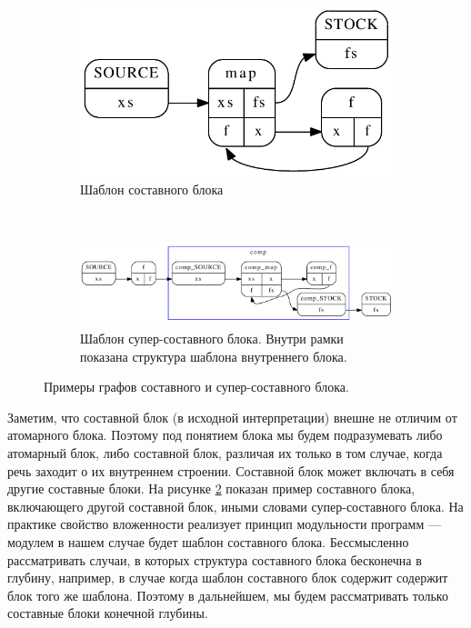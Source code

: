 \documentclass[10pt,a4paper]{article}
\begin{document}
\begin{figure}[H]
  \centering
  \begin{subfigure}[b]{0.3\textwidth}
    \centering
    \includegraphics[width=\textwidth]{example_cg.pdf}
    \caption{Шаблон составного блока}
    \label{example:composite}
  \end{subfigure}
  ~
  \begin{subfigure}[b]{1.0\textwidth}
    \centering
    \includegraphics[width=\textwidth]{cc_cg.pdf}
    \caption{Шаблон супер-составного блока. Внутри рамки показана структура шаблона внутреннего блока.}
    \label{example:supercomposite}
  \end{subfigure}
  
  \caption{ Примеры графов составного и супер-составного блока.}
  \label{example}
\end{figure}

Заметим, что составной блок (в исходной интерпретации) внешне не отличим от атомарного блока.
Поэтому под понятием блока мы будем подразумевать либо атомарный блок, либо составной блок,
различая их только в том случае, когда речь заходит о их внутреннем строении. Составной блок может включать в себя другие составные блоки.
На рисунке \ref{example:supercomposite} показан пример составного блока, включающего другой составной блок, иными словами супер-составного блока.
На практике свойство вложенности реализует принцип модульности программ --- модулем в нашем случае будет шаблон составного блока.
Бессмысленно рассматривать случаи, в которых структура составного блока бесконечна в глубину, например,
в случае когда шаблон составного блок содержит содержит блок того же шаблона. Поэтому в дальнейшем, мы будем рассматривать только составные блоки конечной глубины.
\end{document}
